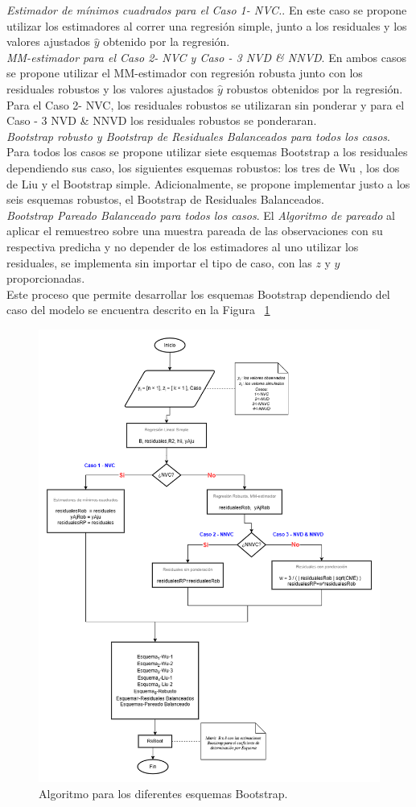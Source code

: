 \textit{Estimador de mínimos cuadrados para el Caso 1- NVC.}. En este caso se propone utilizar los estimadores al correr una regresión simple, junto a los residuales y los valores ajustados $\hat{y}$ obtenido por la regresión.\\


\textit{MM-estimador para el Caso 2- NVC y  Caso - 3 NVD \& NNVD}. En ambos casos se propone utilizar el MM-estimador con regresión robusta junto con los residuales robustos y los valores ajustados $\hat{y}$ robustos obtenidos por la regresión. Para el Caso 2- NVC, los residuales robustos se utilizaran sin ponderar y para el  Caso - 3 NVD \& NNVD los residuales robustos se ponderaran.  \\



\textit{Bootstrap robusto y Bootstrap de Residuales Balanceados para todos los casos}. Para todos los casos se propone utilizar siete esquemas Bootstrap a los residuales dependiendo sus caso, los siguientes esquemas robustos: los tres de Wu , los dos de Liu y el Bootstrap simple. Adicionalmente, se propone implementar justo a los seis esquemas robustos, el Bootstrap de Residuales Balanceados. \\


\textit{Bootstrap Pareado Balanceado para todos los casos}. El \textit{Algoritmo de pareado} al aplicar el remuestreo sobre una muestra pareada de las observaciones con su respectiva predicha y no depender de los estimadores al uno utilizar los residuales, se implementa sin importar el tipo de caso, con las $z$ y $y$ proporcionadas.\\

Este proceso que permite desarrollar los esquemas Bootstrap dependiendo del caso del modelo se encuentra descrito en la Figura ~\ref{fig:AlgDifEsqBoots}

 

\begin{figure}[ht!]
	\centering 
	\includegraphics[width=0.4\linewidth]{img/metodologia_v4.png} 
	\caption{Algoritmo para los diferentes esquemas Bootstrap.}
	\label{fig:AlgDifEsqBoots}
\end{figure}
\FloatBarrier

